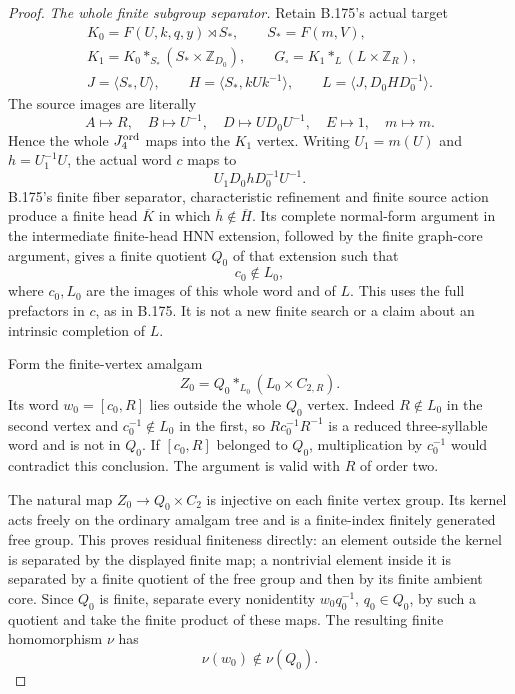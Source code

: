 \begin{proof}
\emph{The whole finite subgroup separator.}
Retain B.175's actual target
\[
 \begin{gathered}
 K_0=F(U,k,q,y)\rtimes S_*,\qquad S_*=F(m,V),\\
 K_1=K_0*_{S_*}(S_*\times\mathbb Z_{D_0}),\qquad
 G_\square=K_1*_{L}(L\times\mathbb Z_R),\\
 J=\langle S_*,U\rangle,\qquad
 H=\langle S_*,kUk^{-1}\rangle,\qquad
 L=\langle J,D_0HD_0^{-1}\rangle.
 \end{gathered}
\]
The source images are literally
\[
 A\mapsto R,\quad B\mapsto U^{-1},\quad
 D\mapsto UD_0U^{-1},\quad E\mapsto1,\quad m\mapsto m.
\]
Hence the whole \(J_4^{\rm ord}\) maps into the \(K_1\) vertex.
Writing \(U_1=m(U)\) and \(h=U_1^{-1}U\), the actual word \(c\) maps to
\[
                     U_1D_0hD_0^{-1}U^{-1}.
\]
B.175's finite fiber separator, characteristic refinement and finite
source action produce a finite head \(\overline K\) in which
\(\overline h\notin\overline H\). Its complete normal-form argument
in the intermediate finite-head HNN extension, followed by the finite
graph-core argument, gives a finite quotient \(Q_0\) of that extension
such that
\[
 c_0\notin L_0,
\]
where \(c_0,L_0\) are the images of this whole word and of \(L\).
This uses the full prefactors in \(c\), as in B.175. It is not a new
finite search or a claim about an intrinsic completion of \(L\).

Form the finite-vertex amalgam
\[
                   Z_0=Q_0*_{L_0}(L_0\times C_{2,R}).
\]
Its word \(w_0=[c_0,R]\) lies outside the whole \(Q_0\) vertex.
Indeed \(R\notin L_0\) in the second vertex and
\(c_0^{-1}\notin L_0\) in the first, so
\(Rc_0^{-1}R^{-1}\) is a reduced three-syllable word and is not in
\(Q_0\). If \([c_0,R]\) belonged to \(Q_0\), multiplication by
\(c_0^{-1}\) would contradict this conclusion. The argument is valid
with \(R\) of order two.

The natural map \(Z_0\to Q_0\times C_2\) is injective on each finite
vertex group. Its kernel acts freely on the ordinary amalgam tree and
is a finite-index finitely generated free group. This proves residual
finiteness directly: an element outside the kernel is separated by the
displayed finite map; a nontrivial element inside it is separated by a
finite quotient of the free group and then by its finite ambient core.
Since \(Q_0\) is finite, separate every nonidentity
\(w_0q_0^{-1}\), \(q_0\in Q_0\), by such a quotient and take the finite
product of these maps. The resulting finite homomorphism \(\nu\) has
\[
                         \nu(w_0)\notin\nu(Q_0).
\]


\end{proof}
